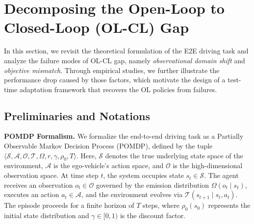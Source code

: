\documentclass{article}
\begin{document}
\section{Decomposing the Open-Loop to Closed-Loop (OL-CL) Gap}
\label{section:decomposition_analysis}
In this section, we revisit the theoretical formulation of the E2E driving task and analyze the failure modes of OL-CL gap, namely \textit{observational domain shift} and \textit{objective mismatch}. Through empirical studies, we further illustrate the performance drop caused by those factors, which motivate the design of a test-time adaptation framework that recovers the
OL policies from failures.

\subsection{Preliminaries and Notations}
\label{subsec:preliminaries}
\noindent \textbf{POMDP Formalism.} We formalize the end-to-end driving task as a Partially Observable Markov Decision Process (POMDP), defined by the tuple $\langle \mathcal{S}, \mathcal{A}, \mathcal{O}, \mathcal{T}, \Omega, r, \gamma, \rho_0, T \rangle$. Here, $\mathcal{S}$ denotes the true underlying state space of the environment, $\mathcal{A}$ is the ego-vehicle's action space, and $\mathcal{O}$ is the high-dimensional observation space. At time step $t$, the system occupies state $s_t \in \mathcal{S}$. The agent receives an observation $o_t \in \mathcal{O}$ governed by the emission distribution $\Omega(o_t \mid s_t)$, executes an action $a_t \in \mathcal{A}$, and the environment evolves via $\mathcal{T}(s_{t+1} \mid s_t, a_t)$. The episode proceeds for a finite horizon of $T$ steps, where $\rho_0(s_0)$ represents the initial state distribution and $\gamma \in [0, 1)$ is the discount factor.
\end{document}
